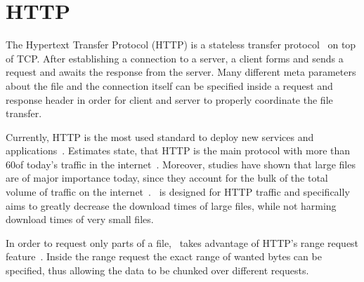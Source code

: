 \section{HTTP}
\label{sec:background-http}

The Hypertext Transfer Protocol (HTTP) is a stateless transfer protocol~\cite{RFC-2616} on top of TCP. 
After establishing a connection to a server, a client forms and sends a request and awaits the response from the server. 
Many different meta parameters about the file and the connection itself can be specified inside a request and response header in order for client and server to properly coordinate the file transfer. 

Currently, HTTP is the most used standard to deploy new services and applications~\cite{defacto-http}.
Estimates state, that HTTP is the main protocol with more than $60$\perc of today's traffic in the internet~\cite{MAIER09-ODC}. 
Moreover, studies have shown that large files are of major importance today, since they account for the bulk of the total volume of traffic on the internet~\cite{MAIER08-ENS}. 
\mhttp~is designed for HTTP traffic and specifically aims to greatly decrease the download times of large files, while not harming download times of very small files.

In order to request only parts of a file, \mhttp~takes advantage of HTTP's range request feature~\cite{RFC-7233}. 
Inside the range request the exact range of wanted bytes can be specified, thus allowing the data to be chunked over different requests. 

